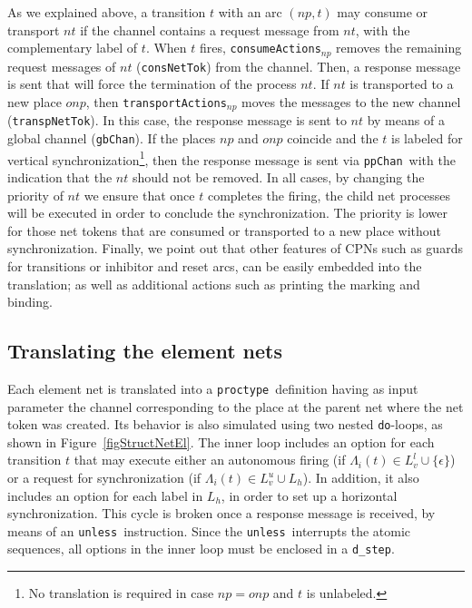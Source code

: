 \documentclass{llncs}
\begin{document}
As we explained above, a transition $t$ with an arc $(np, t)$ may consume or transport $nt$ if the channel contains a request message from $nt$, with the complementary label of $t$.  When $t$ fires, \small\verb"consumeActions"\nfont$_{np}$ removes the remaining request messages of $nt$ (\small\verb"consNetTok"\nfont) from the channel. Then, a response message is sent that will force the termination of the process $nt$. If $nt$ is transported to a new place $onp$, then \small\verb"transportActions"\nfont$_{np}$ moves the messages to the new channel (\small\verb"transpNetTok"\nfont). In this case, the response message is sent to $nt$ by means of a global channel (\small\verb"gbChan"\nfont). If the places $np$ and $onp$ coincide and the $t$ is labeled for vertical synchronization\footnote{No translation is required in case $np=onp$ and $t$ is unlabeled.}, then the response message is sent via \small\verb"ppChan"\nfont\  with the indication that the $nt$ should not be removed.  In all cases, by changing the priority of $nt$ we ensure that once $t$ completes the firing, the child net processes will be executed in order to conclude the synchronization. The priority is lower for those net tokens that are consumed or transported to a new place without synchronization. Finally, we point out that other features of CPNs such as guards for transitions or inhibitor and reset arcs, can be easily embedded into the translation; as well as additional actions such as printing the marking and binding.


\subsection{Translating the element nets}

Each element net is translated into a \small\verb"proctype"\nfont\ definition having as input parameter the channel corresponding to the place at the parent net where the net token was created. Its behavior is also simulated using two nested \small\verb"do"\nfont-loops, as shown in Figure~\ref{figStructNetEl}. The inner loop includes an option for each transition $t$ that may execute either an autonomous firing (if $\Lambda_i(t) \in L_v^l\cup \{\epsilon\}$) or a request for synchronization (if $\Lambda_i(t) \in L_v^u\cup L_h$). In addition, it also includes an option for each label in $L_h$, in order to set up a horizontal synchronization. This cycle is broken  once a response message is received, by means of an \small\verb"unless"\nfont\  instruction. Since the \small\verb"unless"\nfont\  interrupts the atomic sequences, all options in the inner loop must be enclosed in a \small\verb"d_step"\nfont.
\end{document}

